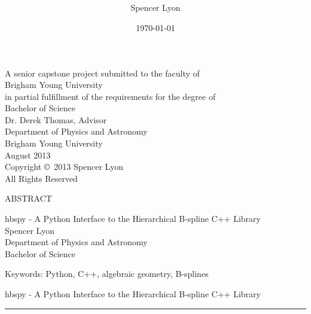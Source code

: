 \documentclass[12pt, twoside]{article}
\title{
    \vspace{-.6in}
    \usefont{OT1}{bch}{b}{n}
    \normalfont \normalsize \textsc{ } \\ [25pt]
    \horrule{0.5pt}
    \huge \thetitle \\
    \horrule{2pt}
  }
\author{
    Spencer Lyon
  }
\date{
  \normalfont \normalsize
  \today \\[-4pt] \normalsize
  }
\theoremstyle{definition} %
\numberwithin{equation}{section}
\newcommand{\mainstretch}{\setstretch{2.0}}
\newcommand \thetitle{hbspy -  A Python Interface to the Hierarchical B-spline C++ Library}
\begin{document}
\begin{titlepage}
  \maketitle
  \thispagestyle{empty}
  \begin{center}

  A senior capstone project submitted to the faculty of \\
  Brigham Young University\\
  in partial fulfillment of the requirements for the degree of \\[\baselineskip]
  Bachelor of Science \\ [1.5cm]

  Dr. Derek Thomas, Advisor \\ [1.5cm]

  Department of Physics and Astronomy \\[\baselineskip]
  Brigham Young University \\[\baselineskip]
  August 2013\\[2.0cm]

  Copyright \copyright\ 2013 Spencer Lyon \\[\baselineskip]

  All Rights Reserved

  \end{center}
\end{titlepage}

  \newpage
  \thispagestyle{empty}
  {\centering
  \large ABSTRACT \\ [\baselineskip]

  \normalfont \normalsize

  \thetitle \\ [\baselineskip]

  Spencer Lyon\\
  Department of Physics and Astronomy\\
  Bachelor of Science \\ [\baselineskip]
  }

  

  \vfill
  \noindent Keywords: Python, C++, algebraic geometry, B-splines

  \newpage
  \tableofcontents

\newpage
{}  %
\setcounter{page}{1}  %
\thispagestyle{empty}
\pagestyle{mainDoc}

\begin{center}
\huge{\thetitle}  %
\rule{\linewidth}{.1pt}
\end{center}

\mainstretch{}







\newpage
\appendix


\end{document}

